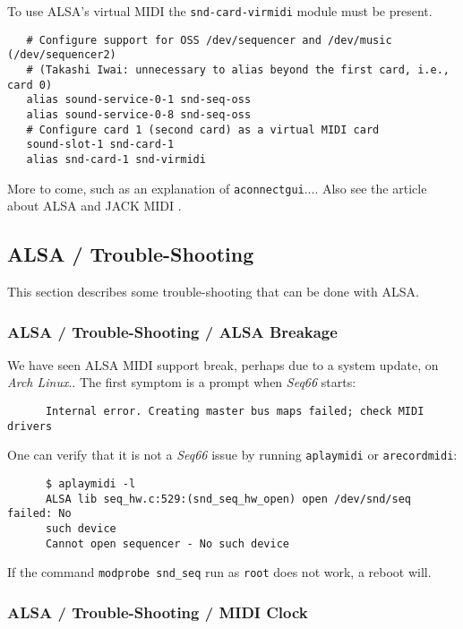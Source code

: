    To use ALSA's virtual MIDI the
   \texttt{snd-card-virmidi} module must be present. 

   \begin{verbatim}
   # Configure support for OSS /dev/sequencer and /dev/music (/dev/sequencer2)
   # (Takashi Iwai: unnecessary to alias beyond the first card, i.e., card 0)
   alias sound-service-0-1 snd-seq-oss
   alias sound-service-0-8 snd-seq-oss
   # Configure card 1 (second card) as a virtual MIDI card
   sound-slot-1 snd-card-1
   alias snd-card-1 snd-virmidi
   \end{verbatim}

   More to come, such as an explanation of \texttt{aconnectgui}....
   Also see the article about ALSA and JACK MIDI \cite{midilinux}.

\subsection{ALSA / Trouble-Shooting}
\label{subsec:alsa_testing}

   This section describes some trouble-shooting that can be done with ALSA.

\subsubsection{ALSA / Trouble-Shooting / ALSA Breakage}
\label{subsubsec:alsa_testing_alsa_breakage}

   We have seen ALSA MIDI support break, perhaps due to a system update, on
   \textsl{Arch Linux}..
   The first symptom is a prompt when \textsl{Seq66} starts:

   \begin{verbatim}
      Internal error. Creating master bus maps failed; check MIDI drivers
   \end{verbatim}

   One can verify that it is not a \textsl{Seq66} issue by running
   \texttt{aplaymidi} or \texttt{arecordmidi}:

   \begin{verbatim}
      $ aplaymidi -l
      ALSA lib seq_hw.c:529:(snd_seq_hw_open) open /dev/snd/seq failed: No
      such device
      Cannot open sequencer - No such device
   \end{verbatim}

   If the command \texttt{modprobe snd\_seq} run as \texttt{root} does
   not work, a reboot will.

\subsubsection{ALSA / Trouble-Shooting / MIDI Clock}
\label{subsubsec:alsa_testing_midi_clock}

